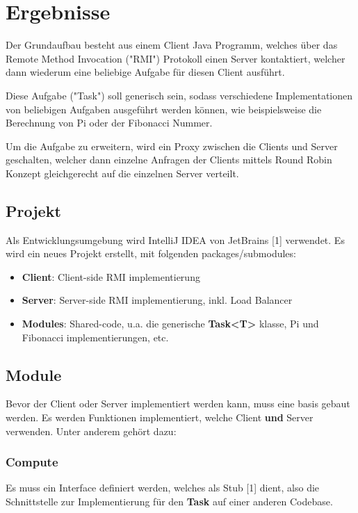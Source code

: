
\section{Ergebnisse}
\label{sec:Ergebnisse}

Der Grundaufbau besteht aus einem Client Java Programm, welches über das Remote Method Invocation ("RMI") Protokoll einen Server kontaktiert, welcher dann wiederum eine beliebige Aufgabe für diesen Client ausführt.

Diese Aufgabe ("Task") soll generisch sein, sodass verschiedene Implementationen von beliebigen Aufgaben ausgeführt werden können, wie beispielsweise die Berechnung von Pi oder der Fibonacci Nummer.

Um die Aufgabe zu erweitern, wird ein Proxy zwischen die Clients und Server geschalten, welcher dann einzelne Anfragen der Clients mittels Round Robin Konzept gleichgerecht auf die einzelnen Server verteilt.

\subsection{Projekt}
Als Entwicklungsumgebung wird IntelliJ IDEA von JetBrains [1] verwendet. Es wird ein neues Projekt erstellt, mit folgenden packages/submodules:
\begin{itemize}
    \item \textbf{Client}: Client-side RMI implementierung
    \item \textbf{Server}: Server-side RMI implementierung, inkl. Load Balancer
    \item \textbf{Modules}: Shared-code, u.a. die generische \textbf{Task<T>} klasse, Pi und Fibonacci implementierungen, etc.
\end{itemize}

\clearpage

\subsection{Module}
Bevor der Client oder Server implementiert werden kann, muss eine basis gebaut werden. Es werden Funktionen implementiert, welche Client \textbf{und} Server verwenden. Unter anderem gehört dazu:

\subsubsection{Compute}
Es muss ein Interface definiert werden, welches als Stub [1] dient, also die Schnittstelle zur Implementierung für den \textbf{Task} auf einer anderen Codebase.

